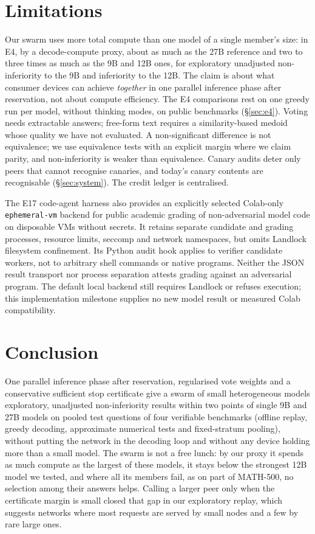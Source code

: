 \documentclass[11pt]{article}
\theoremstyle{definition}
\theoremstyle{remark}
\begin{document}
\section{Limitations}
Our swarm uses more total compute than one model of a single member's size: in E4, by a decode-compute
proxy, about as much as the 27B reference and two to three times as much as the 9B and 12B ones, for
exploratory unadjusted non-inferiority to the 9B and inferiority to the 12B. The claim
is about what consumer devices can achieve \emph{together} in one parallel inference phase after reservation, not about
compute efficiency.
The E4 comparisons rest on one greedy run per model, without thinking modes, on public benchmarks
(\S\ref{sec:e4}). Voting needs extractable answers; free-form text requires a similarity-based medoid whose
quality we have not evaluated. A non-significant difference is not equivalence; we use equivalence tests
with an explicit margin where we claim parity, and non-inferiority is weaker than equivalence. Canary
audits deter only peers that cannot recognise canaries, and today's canary contents are recognisable
(\S\ref{sec:system}). The credit ledger is centralised.

The E17 code-agent harness also provides an explicitly selected Colab-only \texttt{ephemeral-vm}
backend for public academic grading of non-adversarial model code on disposable VMs without secrets.
It retains separate candidate and grading processes, resource limits, seccomp and network namespaces,
but omits Landlock filesystem confinement. Its Python audit hook applies to verifier candidate workers,
not to arbitrary shell commands or native programs. Neither the JSON result transport nor process separation
attests grading against an adversarial program. The default local backend still requires Landlock or refuses
execution; this implementation milestone supplies no new model result or measured Colab compatibility.

\section{Conclusion}
One parallel inference phase after reservation, regularised vote weights and a conservative sufficient
stop certificate give a swarm of small heterogeneous models exploratory, unadjusted non-inferiority
results within two points of single 9B and 27B models on pooled test questions of four verifiable
benchmarks (offline replay, greedy decoding, approximate numerical tests and fixed-stratum pooling), without putting the
network in the decoding loop and without any device holding more than
a small model. The swarm is not a free lunch: by our proxy it spends as much compute as the largest of
these models, it stays below the strongest 12B model we tested, and where all its members fail, as on part
of MATH-500, no selection among their answers helps. Calling a larger peer only when the certificate margin is small closed that gap in
our exploratory replay, which suggests networks where most requests are served by small nodes and a few by rare large
ones.
\end{document}
